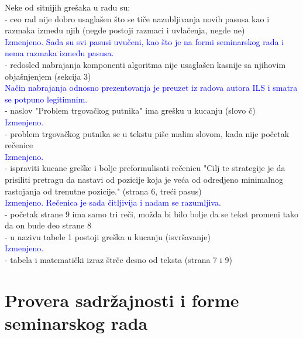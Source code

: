 \documentclass[a4paper]{report}
\newcommand{\odgovor}[1]{\textcolor{blue}{#1}}
\begin{document}
Neke od sitnijih grešaka u radu su: \\
- ceo rad nije dobro usaglašen što se tiče nazubljivanja novih pasusa kao i razmaka između njih (negde postoji razmaci i uvlačenja, negde ne)\\
\odgovor{Izmenjeno. Sada su svi pasusi uvučeni, kao što je na formi seminarskog rada i nema razmaka između pasusa.\\}
- redosled nabrajanja komponenti algoritma nije usaglašen kasnije sa njihovim objašnjenjem  (sekcija 3)\\
\odgovor{Način nabrajanja odnosno prezentovanja je preuzet iz radova autora ILS i smatra se potpuno legitimnim.\\}
- naslov "Problem trgovačkog putnika" ima grešku u kucanju (slovo č)\\
\odgovor{Izmenjeno.\\}
- problem trgovačkog putnika se u tekstu piše malim slovom, kada nije početak rečenice\\
\odgovor{Izmenjeno.\\}
- ispraviti kucane greške i bolje preformulisati rečenicu "Cilj te strategije je da prisiliti pretragu da nastavi od pozicije koja je veća od odredjeno minimalnog rastojanja od trenutne pozicije." (strana 6, treći pasus)\\
\odgovor{Izmenjeno. Rečenica je sada čitljivija i nadam se razumljiva.\\}
- početak strane 9 ima samo tri reči, možda bi bilo bolje da se tekst promeni tako da on bude deo strane 8\\
- u nazivu tabele 1 postoji greška u kucanju (isvršavanje)\\
\odgovor{Izmenjeno.\\}
- tabela i matematički izraz štrče desno od teksta (strana 7 i 9)



\section{Provera sadržajnosti i forme seminarskog rada}
\end{document}

